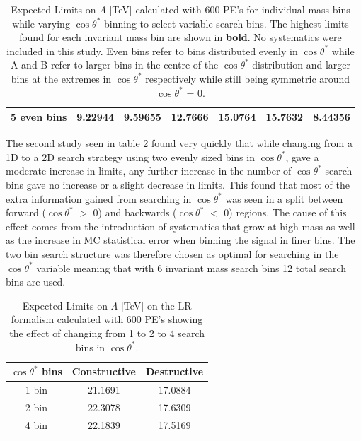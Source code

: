 \begin {table}[h!]
\begin{center}
\begin{tabular}{ |l|c|c|c|c|c|c| }
            5 even bins & {\bf9.22944} & {\bf9.59655} & 12.7666 & 15.0764 & 15.7632 & 8.44356 \\
            \hline
            \hline
        \end{tabular}
        \caption{Expected Limits on $\Lambda$ [TeV] calculated with 600 PE's for individual mass bins while varying $\cos{\theta^{*}}$ binning to select variable search bins. The highest limits found for each invariant mass bin are shown in {\bf bold}. No systematics were included in this study. Even bins refer to bins distributed evenly in $\cos{\theta^{*}}$ while A and B refer to larger bins in the centre of the $\cos{\theta^{*}}$ distribution and larger bins at the extremes in $\cos{\theta^{*}}$ respectively while still being symmetric around $\cos{\theta^{*}}$ = 0.}
        \label{tab:limits_binOpp}
        \end{center}
    \end {table}


    The second study seen in table \ref{tab:limits_fourbin} found very quickly that while changing from a 1D to a 2D search strategy using two evenly sized bins in $\cos{\theta^{*}}$, gave a moderate increase in limits, any further increase in the number of $\cos{\theta^{*}}$ search bins gave no increase or a slight decrease in limits. This found that most of the extra information gained from searching in $\cos{\theta^{*}}$ was seen in a split between forward ($\cos{\theta^{*}}$ $>$ 0) and backwards ($\cos{\theta^{*}}$ $<$ 0) regions. The cause of this effect comes from the introduction of systematics that grow at high mass as well as the increase in MC statistical error when binning the signal in finer bins. 
    The two bin search structure was therefore chosen as optimal for searching in the $\cos{\theta^{*}}$ variable meaning that with 6 invariant mass search bins 12 total search bins are used. 

 
    \begin {table}[h]
        \begin{center}
        \begin{tabular}{ | c | c | c | } 
            \hline
            \hline
            $\cos{\theta^{*}}$ bins & Constructive & Destructive \\
            \hline
            1 bin & 21.1691 & 17.0884 \\
            2 bin & 22.3078 & 17.6309 \\
            4 bin & 22.1839 & 17.5169 \\
            \hline
            \hline
        \end{tabular}
        \caption{Expected Limits on $\Lambda$ [TeV] on the LR formalism calculated with 600 PE's showing the effect of changing from 1 to 2 to 4 search bins in $\cos{\theta^{*}}$.}
        \label{tab:limits_fourbin}
        \end{center}
    \end {table}


